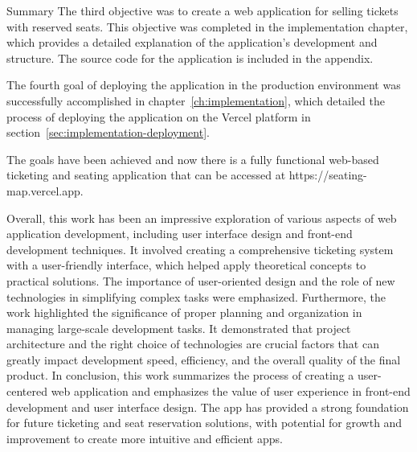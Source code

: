 \begin{section}{Summary}
    The third objective was to create a web application for selling tickets with reserved seats.
    This objective was completed in the implementation chapter, which provides a detailed explanation of the application's development and structure.
    The source code for the application is included in the appendix.

    The fourth goal of deploying the application in the production environment was successfully accomplished in chapter~\ref{ch:implementation}, which detailed the process of deploying the application on the Vercel platform in section~\ref{sec:implementation-deployment}.

    The goals have been achieved and now there is a fully functional web-based ticketing and seating application that can be accessed at https://seating-map.vercel.app.

    Overall, this work has been an impressive exploration of various aspects of web application development, including user interface design and front-end development techniques.
    It involved creating a comprehensive ticketing system with a user-friendly interface, which helped apply theoretical concepts to practical solutions.
    The importance of user-oriented design and the role of new technologies in simplifying complex tasks were emphasized.
    Furthermore, the work highlighted the significance of proper planning and organization in managing large-scale development tasks.
    It demonstrated that project architecture and the right choice of technologies are crucial factors that can greatly impact development speed, efficiency, and the overall quality of the final product.
    In conclusion, this work summarizes the process of creating a user-centered web application and emphasizes the value of user experience in front-end development and user interface design.
    The app has provided a strong foundation for future ticketing and seat reservation solutions, with potential for growth and improvement to create more intuitive and efficient apps.
\end{section}
